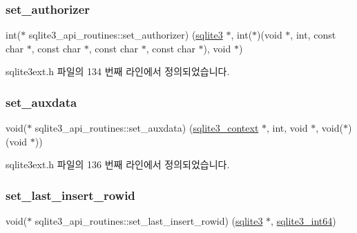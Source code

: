 \mbox{\label{structsqlite3__api__routines_a6d9843596d2d01e52eec89ab50ca6f27}} 
\subsubsection{\texorpdfstring{set\+\_\+authorizer}{set\_authorizer}}
{\footnotesize\ttfamily int($\ast$ sqlite3\+\_\+api\+\_\+routines\+::set\+\_\+authorizer) (\hyperlink{sqlite3_8h_a0ef6f2646262c8a9b24368d8ac140f69}{sqlite3} $\ast$, int($\ast$)(void $\ast$, int, const char $\ast$, const char $\ast$, const char $\ast$, const char $\ast$), void $\ast$)}



sqlite3ext.\+h 파일의 134 번째 라인에서 정의되었습니다.

\mbox{\label{structsqlite3__api__routines_a9e2419b4ef954a24408d3c12fe2b1dd7}} 
\subsubsection{\texorpdfstring{set\+\_\+auxdata}{set\_auxdata}}
{\footnotesize\ttfamily void($\ast$ sqlite3\+\_\+api\+\_\+routines\+::set\+\_\+auxdata) (\hyperlink{sqlite3_8h_a3b519553ffec8fc42b2356f5b1ebdc57}{sqlite3\+\_\+context} $\ast$, int, void $\ast$, void($\ast$)(void $\ast$))}



sqlite3ext.\+h 파일의 136 번째 라인에서 정의되었습니다.

\mbox{\label{structsqlite3__api__routines_a91032b40e6e5987b091bcc5658fea445}} 
\subsubsection{\texorpdfstring{set\+\_\+last\+\_\+insert\+\_\+rowid}{set\_last\_insert\_rowid}}
{\footnotesize\ttfamily void($\ast$ sqlite3\+\_\+api\+\_\+routines\+::set\+\_\+last\+\_\+insert\+\_\+rowid) (\hyperlink{sqlite3_8h_a0ef6f2646262c8a9b24368d8ac140f69}{sqlite3} $\ast$, \hyperlink{sqlite3_8h_a0a4d3e6c1ad46f90e746b920ab6ca0d2}{sqlite3\+\_\+int64})}



